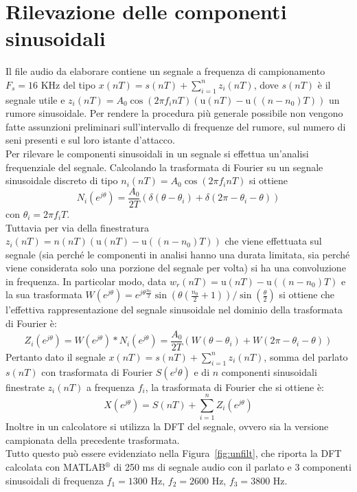 \documentclass[10pt,A4]{article}
\begin{document}
\section{Rilevazione delle componenti sinusoidali}
Il file audio da elaborare contiene un segnale a frequenza di campionamento $F_s = 16$ KHz del tipo $x(nT) = s(nT) + \sum_{i=1}^{n} z_i(nT)$, dove $s(nT)$ è il segnale utile e $z_i(nT) = A_0 \cos(2 \pi f_i n T)(\mathrm{u}(nT) - \mathrm{u}((n - n_0)T))$ un rumore sinusoidale. Per rendere la procedura più generale possibile non vengono fatte assunzioni preliminari sull'intervallo di frequenze del rumore, sul numero di seni presenti e sul loro istante d'attacco. \\
Per rilevare le componenti sinusoidali in un segnale si effettua un'analisi frequenziale del segnale.
Calcolando la trasformata di Fourier su un segnale sinusoidale discreto di tipo $n_i(nT) = A_0 \cos(2 \pi f_i n T)$ si ottiene
\begin{equation}
  N_i(e^{j\theta}) = \frac{A_0}{2T}(\delta(\theta - \theta_i) + \delta(2 \pi - \theta_i - \theta))
\end{equation}
con $\theta_i = 2\pi f_i T$. \\
Tuttavia per via della finestratura $z_i(nT) = n(nT)(\mathrm{u}(nT) - \mathrm{u}((n - n_0)T))$ che viene effettuata sul segnale (sia perché le componenti in analisi hanno una durata limitata, sia perché viene considerata solo una porzione del segnale per volta) si ha una convoluzione in frequenza. In particolar modo, data $w_r(nT) =  \mathrm{u}(nT) - \mathrm{u}((n - n_0)T)$ e la sua trasformata $W(e^{j\theta}) = e^{j\theta \frac{n_0}{2}} \sin(\theta (\frac{n_0}{2} + 1)) / \sin(\frac{\theta} { 2}) $ si ottiene che l'effettiva rappresentazione del segnale sinusoidale nel dominio della trasformata di Fourier è:
\begin{equation}
  Z_i(e^{j\theta}) = W(e^{j\theta}) * N_i(e^{j\theta}) = \frac{A_0}{2T}(W(\theta - \theta_i) + W(2 \pi - \theta_i - \theta))
\end{equation}
Pertanto dato il segnale $x(nT) = s(nT) + \sum_{i=1}^{n} z_i(nT)$, somma del parlato $s(nT)$ con trasformata di Fourier $S(e^j\theta)$ e di $n$ componenti sinusoidali finestrate $z_i(nT)$ a frequenza $f_i$, la trasformata di Fourier che si ottiene è:
\begin{equation}
  X(e^{j\theta}) = S(nT) + \sum_{i=1}^{n} Z_i(e^{j\theta})
\end{equation}
Inoltre in un calcolatore si utilizza la DFT del segnale, ovvero sia la versione campionata della precedente trasformata. \\
Tutto questo può essere evidenziato nella Figura~\ref{fig:unfilt}, che riporta la DFT calcolata con MATLAB$^{\circledR}$ di 250 ms di segnale audio con il parlato e 3 componenti sinusoidali di frequenza $f_1 = 1300$ Hz, $f_2 = 2600$ Hz, $f_3 = 3800$ Hz. \\
\end{document}
